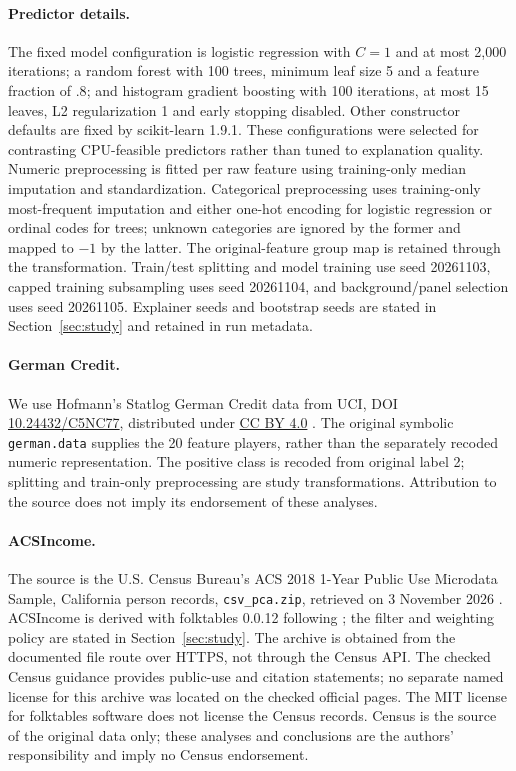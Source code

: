 \paragraph{Predictor details.}
The fixed model configuration is logistic regression with $C=1$ and at most 2,000 iterations; a random forest with 100 trees, minimum leaf size 5 and a feature fraction of $.8$; and histogram gradient boosting with 100 iterations, at most 15 leaves, L2 regularization 1 and early stopping disabled. Other constructor defaults are fixed by scikit-learn 1.9.1. These configurations were selected for contrasting CPU-feasible predictors rather than tuned to explanation quality. Numeric preprocessing is fitted per raw feature using training-only median imputation and standardization. Categorical preprocessing uses training-only most-frequent imputation and either one-hot encoding for logistic regression or ordinal codes for trees; unknown categories are ignored by the former and mapped to $-1$ by the latter. The original-feature group map is retained through the transformation. Train/test splitting and model training use seed 20261103, capped training subsampling uses seed 20261104, and background/panel selection uses seed 20261105. Explainer seeds and bootstrap seeds are stated in Section~\ref{sec:study} and retained in run metadata.

\paragraph{German Credit.}
We use Hofmann's Statlog German Credit data from UCI, DOI \href{https://doi.org/10.24432/C5NC77}{10.24432/C5NC77}, distributed under \href{https://creativecommons.org/licenses/by/4.0/}{CC BY 4.0} \citep{hofmann1994}. The original symbolic \texttt{german.data} supplies the 20 feature players, rather than the separately recoded numeric representation. The positive class is recoded from original label 2; splitting and train-only preprocessing are study transformations. Attribution to the source does not imply its endorsement of these analyses.

\paragraph{ACSIncome.}
The source is the U.S. Census Bureau's ACS 2018 1-Year Public Use Microdata Sample, California person records, \texttt{csv\_pca.zip}, retrieved on 3 November 2026 \citep{uscensus2018pums}. ACSIncome is derived with folktables 0.0.12 following \citet{ding2021retiring}; the filter and weighting policy are stated in Section~\ref{sec:study}. The archive is obtained from the documented file route over HTTPS, not through the Census API. The checked Census guidance provides public-use and citation statements; no separate named license for this archive was located on the checked official pages. The MIT license for folktables software does not license the Census records. Census is the source of the original data only; these analyses and conclusions are the authors' responsibility and imply no Census endorsement.

